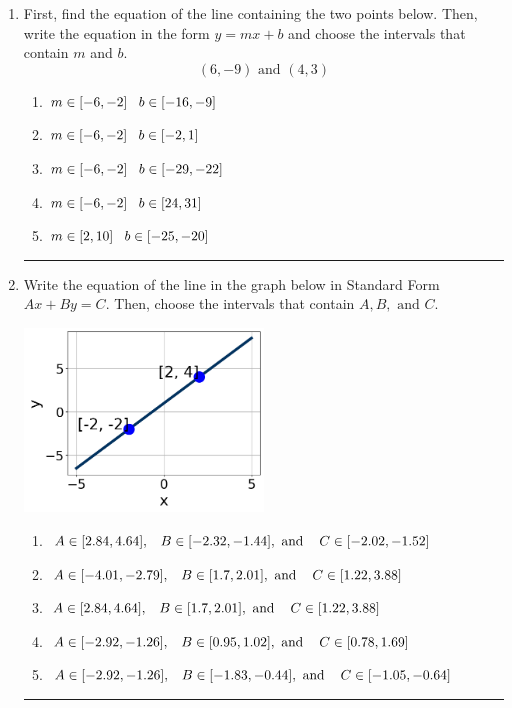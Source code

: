 \documentclass[14pt]{extbook}
\newcommand{\litem}[1]{\item#1\hspace*{-1cm}\rule{\textwidth}{0.4pt}}
\begin{document}
\begin{enumerate}
\litem{
First, find the equation of the line containing the two points below. Then, write the equation in the form $ y=mx+b $ and choose the intervals that contain $m$ and $b$.\[ (6, -9) \text{ and } (4, 3) \]\begin{enumerate}[label=\Alph*.]
\item \( m \in [-6, -2] \hspace*{3mm} b \in [-16, -9] \)
\item \( m \in [-6, -2] \hspace*{3mm} b \in [-2, 1] \)
\item \( m \in [-6, -2] \hspace*{3mm} b \in [-29, -22] \)
\item \( m \in [-6, -2] \hspace*{3mm} b \in [24, 31] \)
\item \( m \in [2, 10] \hspace*{3mm} b \in [-25, -20] \)

\end{enumerate} }
\litem{
Write the equation of the line in the graph below in Standard Form $Ax+By=C$. Then, choose the intervals that contain $A, B, \text{ and } C$.
\begin{center}
    \includegraphics[width=0.5\textwidth]{../Figures/linearGraphToStandardCopyA.png}
\end{center}
\begin{enumerate}[label=\Alph*.]
\item \( A \in [2.84, 4.64], \hspace{3mm} B \in [-2.32, -1.44], \text{ and } \hspace{3mm} C \in [-2.02, -1.52] \)
\item \( A \in [-4.01, -2.79], \hspace{3mm} B \in [1.7, 2.01], \text{ and } \hspace{3mm} C \in [1.22, 3.88] \)
\item \( A \in [2.84, 4.64], \hspace{3mm} B \in [1.7, 2.01], \text{ and } \hspace{3mm} C \in [1.22, 3.88] \)
\item \( A \in [-2.92, -1.26], \hspace{3mm} B \in [0.95, 1.02], \text{ and } \hspace{3mm} C \in [0.78, 1.69] \)
\item \( A \in [-2.92, -1.26], \hspace{3mm} B \in [-1.83, -0.44], \text{ and } \hspace{3mm} C \in [-1.05, -0.64] \)


\end{enumerate}}
\end{enumerate}
\end{document}

